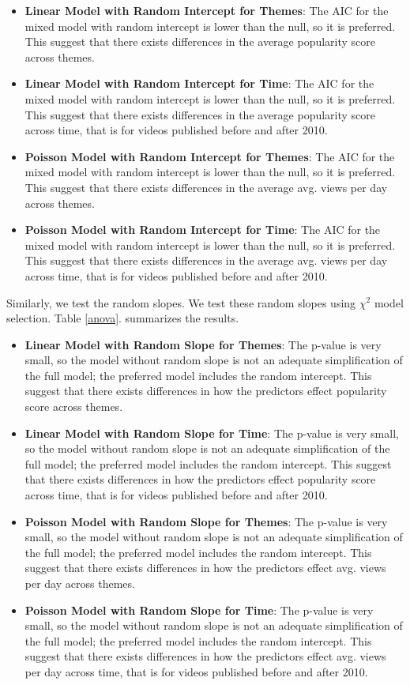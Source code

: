 \begin{itemize}
	\item \textbf{Linear Model with Random Intercept for Themes}: The AIC for the mixed model with random intercept is lower than the null, so it is preferred. This suggest that there exists differences in the average popularity score across themes.
	\item \textbf{Linear Model with Random Intercept for Time}: The AIC for the mixed model with random intercept is lower than the null, so it is preferred. This suggest that there exists differences in the average popularity score across time, that is for videos published before and after 2010.
	\item \textbf{Poisson Model with Random Intercept for Themes}: The AIC for the mixed model with random intercept is lower than the null, so it is preferred. This suggest that there exists differences in the average avg. views per day across themes.
	\item \textbf{Poisson Model with Random Intercept for Time}: The AIC for the mixed model with random intercept is lower than the null, so it is preferred. This suggest that there exists differences in the average avg. views per day across time, that is for videos published before and after 2010.
\end{itemize}

Similarly, we test the random slopes. We test these random slopes using $\chi^2$ model selection. Table \ref{anova}. summarizes the results.
\begin{itemize}
	\item \textbf{Linear Model with Random Slope for Themes}: The p-value is very small, so the model without random slope is not an adequate simplification of the full model; the preferred model includes the random intercept. This suggest that there exists differences in how the predictors effect popularity score across themes.
	\item \textbf{Linear Model with Random Slope for Time}: The p-value is very small, so the model without random slope is not an adequate simplification of the full model; the preferred model includes the random intercept. This suggest that there exists differences in how the predictors effect popularity score across time, that is for videos published before and after 2010.
	\item \textbf{Poisson Model with Random Slope for Themes}: The p-value is very small, so the model without random slope is not an adequate simplification of the full model; the preferred model includes the random intercept. This suggest that there exists differences in how the predictors effect avg. views per day across themes.
	\item \textbf{Poisson Model with Random Slope for Time}: The p-value is very small, so the model without random slope is not an adequate simplification of the full model; the preferred model includes the random intercept. This suggest that there exists differences in how the predictors effect avg. views per day across time, that is for videos published before and after 2010.
\end{itemize}
